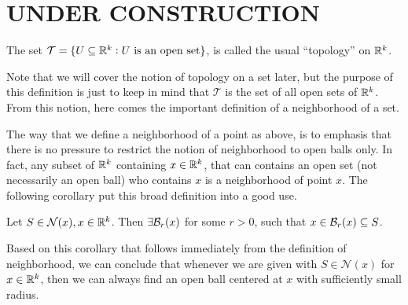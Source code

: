 %
%
%
%


\newpage

\section{UNDER CONSTRUCTION}
\begin{definition}
	The set $\mathcal{T} = \{ U \subseteq \mathbb{R}^k: U \text{ is an open set} \}$, is called the usual ``topology'' on $\mathbb{R}^k$.
\end{definition}
Note that we will cover the notion of topology on a set later, but the purpose of this definition is just to keep in mind that $\mathcal{T}$ is the set of all open sets of $\mathbb{R}^k$. From this notion, here comes the important definition of a neighborhood of a set.


The way that we define a neighborhood of a point as above, is to emphasis that there is no pressure to restrict the notion of neighborhood to open balls only. In fact, any subset of $\mathbb{R}^k$ containing $x\in\mathbb{R}^k$, that can contains an open set (not necessarily an open ball) who contains $x$ is a neighborhood of point $x$. The following corollary put this broad definition into a good use.
\begin{corollary}
	Let $S \in \mathcal{N}(x), x\in\mathbb{R}^k$. Then $\exists \mathcal{B}_{r}(x)$ for some $r>0$, such that $x\in\mathcal{B}_{r}(x)\subseteq S$.
\end{corollary}
Based on this corollary that follows immediately from the definition of neighborhood, we can conclude that whenever we are given with $S\in\mathcal{N}(x)$ for $x\in\mathbb{R}^k$, then we can always find an open ball centered at $x$ with sufficiently small radius. 

